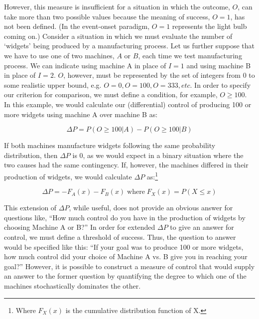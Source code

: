 \documentclass[USenglish,letterpaper,12pt,extrafontsizes,oneside,onecolumn,final]{memoir}
\newcommand{\deltap}{$\Delta P$}
\begin{document}
However, this measure is insufficient for a situation in which the outcome, $O$, can take more than two possible values because the meaning of success, $O=1$, has not been defined. (In the event-onset paradigm, $O=1$ represents the light bulb coming on.) Consider a situation in which we must evaluate the number of `widgets' being produced by a manufacturing process.  Let us further suppose that we have to use one of two machines, $A$ or $B$, each time we test manufacturing process. We can indicate using machine A in place of $I=1$ and using machine B in place of $I=2$.  $O$, however, must be represented by the set of integers from 0 to some realistic upper bound, e.g. $O=0, O=100, O=333, etc.$ In order to specify our criterion for comparison, we must define a condition, for example, $O \ge 100$. In this example, we would calculate our (differential) control of producing 100 or more widgets using machine A over machine B as:

\begin{displaymath}
\Delta P = P(O \ge 100|A) - P(O \ge 100|B)
\end{displaymath}

If both machines manufacture widgets following the same probability distribution, then \deltap \xspace is $0$, as we would expect in a binary situation where the two causes had the same contingency.  If, however, the machines differed in their production of widgets, we would calculate \deltap \xspace as:\footnote{Where $F_X(x)$ is the cumulative distribution function of X.}

\begin{displaymath}
\Delta P = -F_A(x) - F_B(x) \; \mbox{where} \; F_X(x) = P(X \le x) 
\end{displaymath}

This extension of \deltap, while useful, does not provide an obvious answer for questions like, ``How much control do you have in the production of widgets by choosing Machine A or B?'' In order for extended \deltap \xspace to give an answer for control, we must define a threshold of success. Thus, the question to answer would be specified like this: ``If your goal was to produce 100 or more widgets, how much control did your choice of Machine A vs. B give you in reaching your goal?'' However, it is possible to construct a measure of control that would supply an answer to the former question by quantifying the degree to which one of the machines stochastically dominates the other.
 
\end{document}
